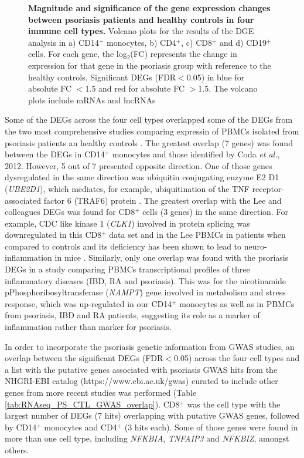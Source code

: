 \begin{figure}[htbp]
\caption[Magnitude and significance of the gene expression changes between psoriasis patients and healthy controls in four immune cell types.]{\textbf{Magnitude and significance of the gene expression changes between psoriasis patients and healthy controls in four immune cell types.} Volcano plots for the results of the DGE analysis in a) CD14$^+$ monocytes, b) CD4$^+$, c) CD8$^+$ and d) CD19$^+$ cells. For each gene, the log$_2$(FC) represents the change in expression for that gene in the psoriasis group with reference to the healthy controls. Significant DEGs (FDR$<$0.05) in blue for absolute FC $<$1.5 and red for absolute FC $>$1.5. The volcano plots include mRNAs and lncRNAs}
\label{figure:RNAseq_PS_CTL_volcano_plots}
\end{figure} 


Some of the DEGs across the four cell types overlapped some of the DEGs from the two most comprehensive studies comparing expressin of PBMCs isolated from psoriasis patients an healthy controls \parencite{Leo2009,Coda2012}. The greatest overlap (7 genes) was found between the DEGs in CD14$^+$ monocytes and those identified by Coda \textit{et al.}, 2012. However, 5 out of 7 presented opposite direction. One of those genes dysregulated in the same direction was ubiquitin conjugating enzyme E2 D1 (\textit{UBE2D1}), which mediates, for example, ubiquitination of the TNF receptor-associated factor 6 (TRAF6) protein \parencite{Gru2008}. The greatest overlap with the Lee and colleagues DEGs was found for CD8$^+$ cells (3 genes) in the same direction. For example, CDC like kinase 1 (\textit{CLK1}) involved in protein splicing was downregulated in this CD8$^+$ data set and in the Lee PBMCs in patients when compared to controls and its deficiency has been shown to lead to neuro-inflammation in mice \parencite{Gu2017}. Similarly, only one overlap was found with the psoriasis DEGs in a study comparing PBMCs transcriptional profiles of three inflammatory diseases (IBD, RA and psoriasis)\parencite{Mesko2010}. This was for the nicotinamide pPhosphoribosyltransferase (\textit{NAMPT}) gene involved in metabolism and stress response, which was up-regulated in our CD14$^+$ monocytes as well as in PBMCs from psoriasis, IBD and RA patients, suggesting its role as a marker of inflammation rather than marker for psoriasis.

In order to incorporate the psoriasis genetic information from GWAS studies, an overlap between the significant DEGs (FDR$<$0.05) across the four cell types and a list with the putative genes associated with psoriasis GWAS hits from the NHGRI-EBI catalog (https://www.ebi.ac.uk/gwas) curated to include other genes from more recent studies was performed (Table \ref{tab:RNAseq_PS_CTL_GWAS_overlap}). CD8$^+$ was the cell type with the largest number of DEGs (7 hits) overlapping with putative GWAS genes, followed by CD14$^+$ monocytes and CD4$^+$ (3 hits each). Some of those genes were found in more than one cell type, including \textit{NFKBIA}, \textit{TNFAIP3} and \textit{NFKBIZ}, amongst others.  


